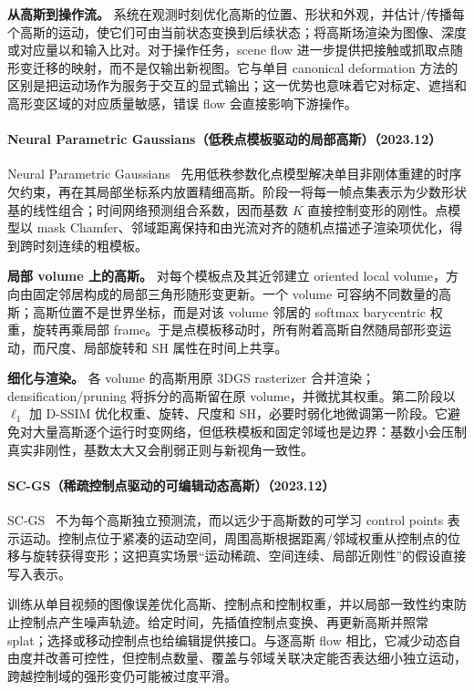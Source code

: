\textbf{从高斯到操作流。} 系统在观测时刻优化高斯的位置、形状和外观，并估计/传播每个高斯的运动，使它们可由当前状态变换到后续状态；将高斯场渲染为图像、深度或对应量以和输入比对。对于操作任务，scene flow 进一步提供把接触或抓取点随形变迁移的映射，而不是仅输出新视图。它与单目 canonical deformation 方法的区别是把运动场作为服务于交互的显式输出；这一优势也意味着它对标定、遮挡和高形变区域的对应质量敏感，错误 flow 会直接影响下游操作。

\paragraph{Neural Parametric Gaussians（低秩点模板驱动的局部高斯）（2023.12）}
Neural Parametric Gaussians~\cite{2312_01196} 先用低秩参数化点模型解决单目非刚体重建的时序欠约束，再在其局部坐标系内放置精细高斯。阶段一将每一帧点集表示为少数形状基的线性组合；时间网络预测组合系数，因而基数 $K$ 直接控制变形的刚性。点模型以 mask Chamfer、邻域距离保持和由光流对齐的随机点描述子渲染项优化，得到跨时刻连续的粗模板。

\textbf{局部 volume 上的高斯。} 对每个模板点及其近邻建立 oriented local volume，方向由固定邻居构成的局部三角形随形变更新。一个 volume 可容纳不同数量的高斯；高斯位置不是世界坐标，而是对该 volume 邻居的 softmax barycentric 权重，旋转再乘局部 frame。于是点模板移动时，所有附着高斯自然随局部形变运动，而尺度、局部旋转和 SH 属性在时间上共享。

\textbf{细化与渲染。} 各 volume 的高斯用原 3DGS rasterizer 合并渲染；densification/pruning 将拆分的高斯留在原 volume，并微扰其权重。第二阶段以 $\ell_1$ 加 D-SSIM 优化权重、旋转、尺度和 SH，必要时弱化地微调第一阶段。它避免对大量高斯逐个运行时变网络，但低秩模板和固定邻域也是边界：基数小会压制真实非刚性，基数太大又会削弱正则与新视角一致性。

\paragraph{SC-GS（稀疏控制点驱动的可编辑动态高斯）（2023.12）}
SC-GS~\cite{2312_14937} 不为每个高斯独立预测流，而以远少于高斯数的可学习 control points 表示运动。控制点位于紧凑的运动空间，周围高斯根据距离/邻域权重从控制点的位移与旋转获得变形；这把真实场景“运动稀疏、空间连续、局部近刚性”的假设直接写入表示。

训练从单目视频的图像误差优化高斯、控制点和控制权重，并以局部一致性约束防止控制点产生噪声轨迹。给定时间，先插值控制点变换、再更新高斯并照常 splat；选择或移动控制点也给编辑提供接口。与逐高斯 flow 相比，它减少动态自由度并改善可控性，但控制点数量、覆盖与邻域关联决定能否表达细小独立运动，跨越控制域的强形变仍可能被过度平滑。

